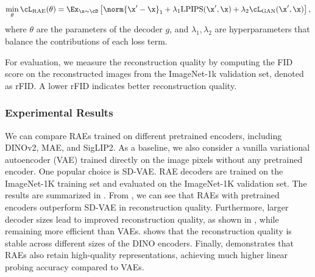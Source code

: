 \documentclass[../../book-main.tex]{subfiles}
\begin{document}
\begin{equation}
\min_{\theta} \cL_{\mathrm{RAE}}(\theta) = \Ex_{\x \sim \cD} \left[
    \norm{\x' - \x}_1 + \lambda_1 \mathrm{LPIPS}(\x', \x) + \lambda_2
\cL_{\mathrm{GAN}}(\x', \x) \right],
\end{equation}
where $\theta$ are the parameters of the decoder $g$, and $\lambda_1,
\lambda_2$ are hyperparameters that balance the contributions of each loss term.

For evaluation, we measure the reconstruction quality by computing
the FID score \cite{heusel2017gans} on the reconstructed images from
the ImageNet-1k validation set, denoted as rFID. A lower rFID
indicates better reconstruction quality.

\subsubsection{Experimental Results}
We can compare RAEs trained on different pretrained encoders,
including DINOv2, MAE, and SigLIP2. As a baseline, we also consider a
vanilla variational autoencoder (VAE) trained directly on the image
pixels without any pretrained encoder. One popular choice is SD-VAE.
RAE decoders are trained on the ImageNet-1K training set and
evaluated on the ImageNet-1K validation set. The results are
summarized in . From
, we can see that RAEs with
pretrained encoders outperform SD-VAE in reconstruction quality.
Furthermore, larger decoder sizes lead to improved reconstruction
quality, as shown in , while
remaining more efficient than VAEs. 
shows that the reconstruction quality is stable across different
sizes of the DINO encoders. Finally, 
demonstrates that RAEs also retain high-quality representations,
achieving much higher linear probing accuracy compared to VAEs.
\end{document}
